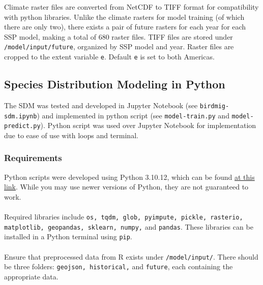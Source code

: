 \documentclass{article}
\begin{document}
Climate raster files are converted from NetCDF to TIFF format for compatibility with python libraries.
Unlike the climate rasters for model training (of which there are only two), there exists a pair of future rasters for each year for each SSP model, making a total of 680 raster files. 
TIFF files are stored under \texttt{/model/input/future}, organized by SSP model and year.
Raster files are cropped to the extent variable \texttt{e}. Default \texttt{e} is set to both Americas.

\subsection{Species Distribution Modeling in Python}

The SDM was tested and developed in Jupyter Notebook (see \texttt{birdmig-sdm.ipynb}) and implemented in python script (see \texttt{model-train.py} and \texttt{model-predict.py}). Python script was used over Jupyter Notebook for implementation due to ease of use with loops and terminal.

\subsubsection*{Requirements}
Python scripts were developed using Python 3.10.12, which can be found \href{https://www.python.org/downloads/}{at this link}. While you may use newer versions of Python, they are not guaranteed to work.
\\\\
Required libraries include \texttt{os, tqdm, glob, pyimpute, pickle, rasterio, matplotlib, geopandas, sklearn, numpy,} and \texttt{pandas}. These libraries can be installed in a Python terminal using \texttt{pip}.
\\\\
Ensure that preprocessed data from R exists under \texttt{/model/input/}. There should be three folders: \texttt{geojson, historical,} and \texttt{future}, each containing the appropriate data.
\end{document}
